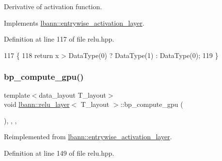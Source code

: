Derivative of activation function. 

Implements \hyperlink{classlbann_1_1entrywise__activation__layer_a7676a4c5060452a38264993554e79f8e}{lbann\+::entrywise\+\_\+activation\+\_\+layer}.



Definition at line 117 of file relu.\+hpp.


\begin{DoxyCode}
117                                                             \{
118     \textcolor{keywordflow}{return} x > DataType(0) ? DataType(1) : DataType(0);
119   \}
\end{DoxyCode}
\mbox{\label{classlbann_1_1relu__layer_a236d3e3c92376465d79104703bc8b005}} 
\subsubsection{\texorpdfstring{bp\+\_\+compute\+\_\+gpu()}{bp\_compute\_gpu()}}
{\footnotesize\ttfamily template$<$data\+\_\+layout T\+\_\+layout$>$ \\
void \hyperlink{classlbann_1_1relu__layer}{lbann\+::relu\+\_\+layer}$<$ T\+\_\+layout $>$\+::bp\+\_\+compute\+\_\+gpu (\begin{DoxyParamCaption}{ }\end{DoxyParamCaption})\hspace{0.3cm}{\ttfamily [inline]}, {\ttfamily [override]}, {\ttfamily [protected]}, {\ttfamily [virtual]}}



Reimplemented from \hyperlink{classlbann_1_1entrywise__activation__layer_a569674cb4c0f50ea76acc0733fc53ba9}{lbann\+::entrywise\+\_\+activation\+\_\+layer}.



Definition at line 149 of file relu.\+hpp.


